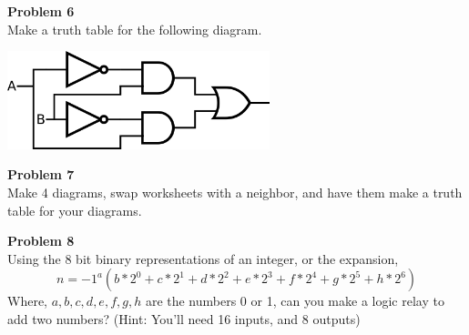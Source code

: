 \documentclass[11pt]{report}
\begin{document}
\vspace{2in}
\begin{center}
    \textbf{Problem 6}\\
    Make a truth table for the following diagram.
    \vspace{.8in}
\end{center}
\begin{center}
    \begin{minipage}{\linewidth}
        \includegraphics[width=3in]{images/xor_problem.png}
    \end{minipage}
\end{center}
\newpage
\begin{center}
    \textbf{Problem 7}\\
    Make 4 diagrams, swap worksheets with a neighbor, and have them make a truth
    table for your diagrams.
\end{center}
\newpage
\begin{center}
    \textbf{Problem 8}\\
    Using the 8 bit binary representations of an integer, or the expansion,
    \[
        n=-1^{a}(b*2^{0}+c*2^{1}+d*2^{2}+e*2^{3}+f*2^{4}+g*2^{5}+h*2^{6})
    \]
    Where, $a,b,c,d,e,f,g,h$ are the numbers 0 or 1, can you make a logic
    relay to add two numbers? (Hint: You'll need 16 inputs, and 8 outputs)
\end{center}
\end{document}
